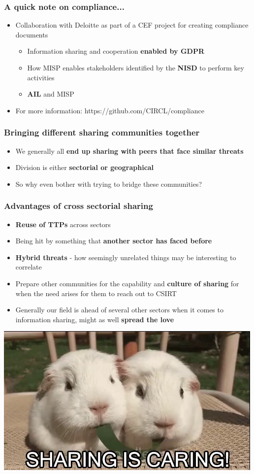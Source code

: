 \begin{frame}
\frametitle{A quick note on compliance...}
\begin{itemize}
	\item Collaboration with Deloitte as part of a CEF project for creating compliance documents
	\begin{itemize}
		\item Information sharing and cooperation {\bf enabled by GDPR}
		\item How MISP enables stakeholders identified by the {\bf NISD} to perform key activities
		\item {\bf AIL} and MISP
	\end{itemize}
	\item For more information: https://github.com/CIRCL/compliance
\end{itemize}
\end{frame}

\begin{frame}
\frametitle{Bringing different sharing communities together}
\begin{itemize}
	\item We generally all {\bf end up sharing with peers that face similar threats}
	\item Division is either {\bf sectorial or geographical}
	\item So why even bother with trying to bridge these communities?
\end{itemize}
\end{frame}

\begin{frame}
\frametitle{Advantages of cross sectorial sharing}
\begin{itemize}
	\item {\bf Reuse of TTPs} across sectors
	\item Being hit by something that {\bf another sector has faced before}
	\item {\bf Hybrid threats} - how seemingly unrelated things may be interesting to correlate
	\item Prepare other communities for the capability and {\bf culture of sharing} for when the need arises for them to reach out to CSIRT
	\item Generally our field is ahead of several other sectors when it comes to information sharing, might as well {\bf spread the love}
\end{itemize}
\includegraphics[scale=0.3]{screenshots/sharing.jpeg}
\end{frame}

